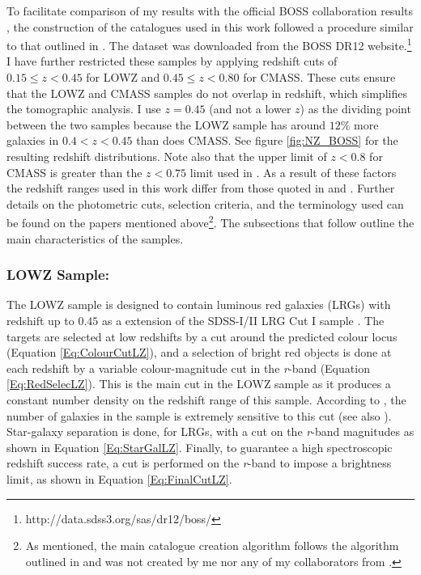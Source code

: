 To facilitate comparison of my results with the official BOSS collaboration results \citep{2016BOSSCosmology}, the construction of the catalogues used in this work followed a procedure similar to that outlined in \cite{BOSSCatalogue2016}. The dataset was downloaded from the BOSS DR12 website.\footnote{http://data.sdss3.org/sas/dr12/boss/} I have further restricted these samples by applying redshift cuts of $0.15 \leq z < 0.45$ for LOWZ and $0.45 \leq z < 0.80$ for CMASS. These cuts ensure that the LOWZ and CMASS samples do not overlap in redshift, which simplifies the tomographic analysis. I use $z = 0.45$ (and not a lower $z$) as the dividing point between the two samples because the LOWZ sample has around $12\%$ more galaxies in $0.4 < z < 0.45$ than does CMASS. See figure \ref{fig:NZ_BOSS} for the resulting redshift distributions. Note also that the upper limit of $z < 0.8$ for CMASS is greater than the $z < 0.75$ limit used in \cite{BOSSCatalogue2016}. As a result of these factors the redshift ranges used in this work differ from those quoted in \cite{BOSSCatalogue2016} and \cite{2016BOSSCosmology}. Further details on the photometric cuts, selection criteria, and the terminology used can be found on the papers mentioned above\footnote{As mentioned, the main catalogue creation algorithm follows the algorithm outlined in \cite{BOSSCatalogue2016} and was not created by me nor any of my collaborators from \cite{2018LoureiroBOSS}.}. The subsections that follow outline the main characteristics of the samples.

\subsubsection{LOWZ Sample:}
The LOWZ sample is designed to contain luminous red galaxies (LRGs) with redshift up to $0.45$ as a extension of the SDSS-I/II LRG Cut I sample \citep{2001Eisenstein}. The targets are selected at low redshifts by a cut around the predicted colour locus (Equation \ref{Eq:ColourCutLZ}), and a selection of bright red objects is done at each redshift by a variable colour-magnitude cut in the \textit{r}-band (Equation \ref{Eq:RedSelecLZ}). This is the main cut in the LOWZ sample as it produces a constant number density on the redshift range of this sample. According to \cite{BOSSCatalogue2016}, the number of galaxies in the sample is extremely sensitive to this cut (see also \cite{2013ROSS}). Star-galaxy separation is done, for LRGs, with a cut on the \textit{r}-band magnitudes as shown in Equation \eqref{Eq:StarGalLZ}. Finally, to guarantee a high spectroscopic redshift success rate, a cut is performed on the \textit{r}-band to impose a brightness limit, as shown in Equation \eqref{Eq:FinalCutLZ}.

